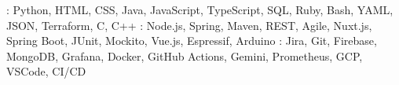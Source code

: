 
    {: Python, HTML, CSS, Java, JavaScript, TypeScript, SQL, Ruby, Bash, YAML, JSON, Terraform, C, C++}
    {: Node.js, Spring, Maven, REST, Agile, Nuxt.js, Spring Boot, JUnit, Mockito, Vue.js, Espressif, Arduino}
    {: Jira, Git, Firebase, MongoDB, Grafana, Docker, GitHub Actions, Gemini, Prometheus, GCP, VSCode, CI/CD}